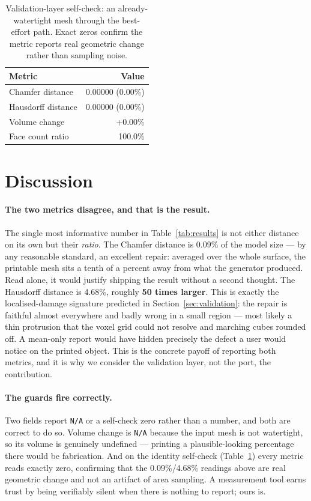 \documentclass[11pt,a4paper]{article}
\begin{document}
\begin{table}[h]
\centering
\caption{Validation-layer self-check: an already-watertight mesh through the
best-effort path. Exact zeros confirm the metric reports real geometric change
rather than sampling noise.}
\label{tab:selfcheck}
\begin{tabular}{lr}
\toprule
\textbf{Metric} & \textbf{Value} \\
\midrule
Chamfer distance   & 0.00000 (0.00\%) \\
Hausdorff distance & 0.00000 (0.00\%) \\
Volume change      & +0.00\% \\
Face count ratio   & 100.0\% \\
\bottomrule
\end{tabular}
\end{table}

\section{Discussion}
\label{sec:discussion}

\paragraph{The two metrics disagree, and that is the result.}
The single most informative number in Table~\ref{tab:results} is not either
distance on its own but their \emph{ratio}. The Chamfer distance is
0.09\% of the model size --- by any reasonable standard, an excellent repair:
averaged over the whole surface, the printable mesh sits a tenth of a percent
away from what the generator produced. Read alone, it would justify shipping the
result without a second thought. The Hausdorff distance is 4.68\%, roughly
\textbf{50 times larger}. This is exactly the localised-damage signature
predicted in Section~\ref{sec:validation}: the repair is faithful almost
everywhere and badly wrong in a small region --- most likely a thin protrusion
that the voxel grid could not resolve and marching cubes rounded off. A
mean-only report would have hidden precisely the defect a user would notice on
the printed object. This is the concrete payoff of reporting both metrics, and
it is why we consider the validation layer, not the port, the contribution.

\paragraph{The guards fire correctly.}
Two fields report \texttt{N/A} or a self-check zero rather than a number, and
both are correct to do so. Volume change is \texttt{N/A} because the input mesh
is not watertight, so its volume is genuinely undefined --- printing a
plausible-looking percentage there would be fabrication. And on the identity
self-check (Table~\ref{tab:selfcheck}) every metric reads exactly zero,
confirming that the 0.09\%/4.68\% readings above are real geometric change and
not an artifact of area sampling. A measurement tool earns trust by being
verifiably silent when there is nothing to report; ours is.
\end{document}
